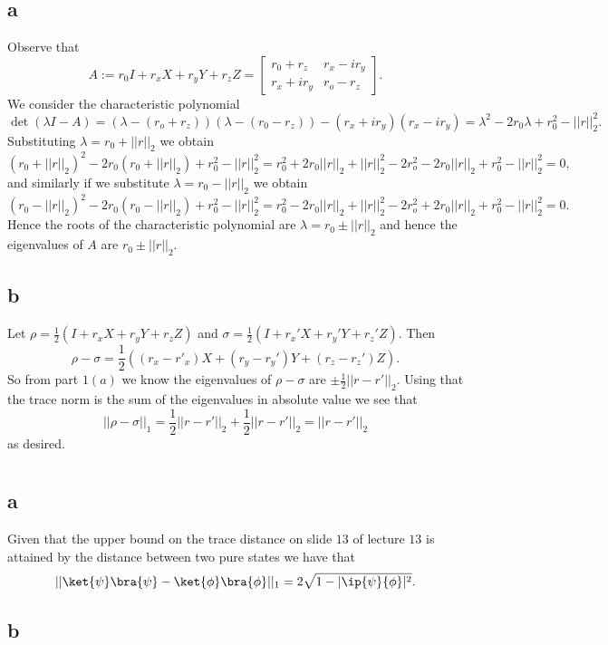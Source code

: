 \documentclass[letterpaper,12pt,oneside,onecolumn]{article}
\begin{document}
\section{}
\subsection{a}
Observe that 
$$A:= r_0I + r_xX + r_yY + r_zZ = \begin{bmatrix}
r_0 + r_z & r_x - ir_y \\ r_x + ir_y & r_o -r_z
\end{bmatrix}.$$
We consider the characteristic polynomial
$$\det(\lambda I - A) = (\lambda - (r_o+r_z))(\lambda - (r_0 -r_z)) -(r_x+ir_y)(r_x-ir_y) = \lambda^2 - 2r_0\lambda +r_0^2 - ||r||_2^2.$$
Substituting $\lambda = r_0 + ||r||_2$ we obtain
$$(r_0 + ||r||_2)^2 - 2r_0(r_0 + ||r||_2) + r_0^2 - ||r||_2^2 = r_0^2 + 2r_0||r||_2 + ||r||_2^2 - 2r_o^2 -2r_0||r||_2 +r_0^2 - ||r||_2^2 = 0,$$
and similarly if we substitute $\lambda=r_0 - ||r||_2$ we obtain
$$(r_0 - ||r||_2)^2 - 2r_0(r_0 -||r||_2) + r_0^2 - ||r||_2^2 = r_0^2 - 2r_0||r||_2 + ||r||_2^2 - 2r_o^2 +2r_0||r||_2 +r_0^2 - ||r||_2^2 = 0.$$
Hence the roots of the characteristic polynomial are $\lambda = r_0 \pm ||r||_2$ and hence the eigenvalues of $A$ are  $r_0 \pm ||r||_2$.
\subsection{b}
Let $\rho = \frac{1}{2}(I + r_xX + r_yY + r_zZ)$ and $\sigma =  \frac{1}{2}(I + r_x'X + r_y'Y + r_z'Z)$. Then
$$\rho-\sigma =\frac{1}{2}( (r_x-r'_x)X + (r_y-r_y')Y + (r_z-r_z')Z).$$
So from part $1(a)$ we know the eigenvalues of $\rho-\sigma$ are $\pm \frac{1}{2}||r - r'||_2.$
Using that the trace norm is the sum of the eigenvalues in absolute value we see that
$$||\rho-\sigma||_1 = \frac{1}{2}||r-r'||_2 + \frac{1}{2}||r-r'||_2 = ||r-r'||_2$$
as desired.
\section{}
\subsection{a}
Given that the upper bound on the trace distance on slide $13$ of lecture $13$ is attained by the distance between two pure states we have that
$$||\ket{\psi}\bra{\psi} - \ket{\phi}\bra{\phi}||_1 = 2\sqrt{1-|\ip{\psi}{\phi} |^2}.$$
\subsection{b}
\end{document}
